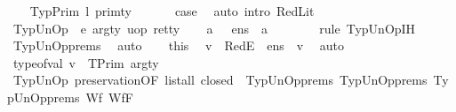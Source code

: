 \begin{isabellebody}
\isamarkupfalse%
\isanewline
\ \ \isamarkupfalse%
\ {\isacharparenleft}{\kern0pt}TypPrim\ l\ prim{\isacharunderscore}{\kern0pt}ty\ {\isasymDelta}{\isacharparenright}{\kern0pt}\isanewline
\ \ \isamarkupfalse%
\ \isamarkupfalse%
\ {\isacharquery}{\kern0pt}case\ \isamarkupfalse%
\ {\isacharparenleft}{\kern0pt}auto\ intro{\isacharcolon}{\kern0pt}\ RedLit{\isacharparenright}{\kern0pt}\isanewline
{}\isamarkupfalse%
\isanewline
\ \ \isamarkupfalse%
\ {\isacharparenleft}{\kern0pt}TypUnOp\ {\isasymDelta}\ e\ arg{\isacharunderscore}{\kern0pt}ty\ uop\ ret{\isacharunderscore}{\kern0pt}ty{\isacharparenright}{\kern0pt}\isanewline
\ \ \isamarkupfalse%
\ {\isachardoublequoteopen}{\isasymexists}a{\isachardot}{\kern0pt}\ {\isasymLambda}{\isacharcomma}{\kern0pt}{\isasymGamma}{\isacharcomma}{\kern0pt}{\isasymOmega}\ {\isasymturnstile}\ {\isasymlangle}e{\isacharcomma}{\kern0pt}n{\isacharunderscore}{\kern0pt}s{\isasymrangle}\ {\isasymDown}\ a{\isachardoublequoteclose}\ \isanewline
\ \ \ \ \ \isamarkupfalse%
\ {\isacharparenleft}{\kern0pt}rule\ TypUnOp{\isachardot}{\kern0pt}IH{\isacharparenright}{\kern0pt}\ \isamarkupfalse%
\ TypUnOp{\isachardot}{\kern0pt}prems\ \isamarkupfalse%
\ auto\isanewline
\ \ \isamarkupfalse%
\ this\ \isamarkupfalse%
\ v{\isacharprime}{\kern0pt}\ \ RedE{\isacharcolon}{\kern0pt}{\isachardoublequoteopen}{\isasymLambda}{\isacharcomma}{\kern0pt}{\isasymGamma}{\isacharcomma}{\kern0pt}{\isasymOmega}\ {\isasymturnstile}\ {\isasymlangle}e{\isacharcomma}{\kern0pt}n{\isacharunderscore}{\kern0pt}s{\isasymrangle}\ {\isasymDown}\ v{\isacharprime}{\kern0pt}{\isachardoublequoteclose}\ \isamarkupfalse%
\ auto\isanewline
\ \ \isamarkupfalse%
\ {\isachardoublequoteopen}type{\isacharunderscore}{\kern0pt}of{\isacharunderscore}{\kern0pt}val\ v{\isacharprime}{\kern0pt}\ {\isacharequal}{\kern0pt}\ TPrim\ arg{\isacharunderscore}{\kern0pt}ty{\isachardoublequoteclose}\ \ \ \ \ \ \ \ \ \isanewline
\ \ \ \ \isamarkupfalse%
\ TypUnOp\ preservation{\isacharparenleft}{\kern0pt}{}{\isacharparenright}{\kern0pt}{\isacharbrackleft}{\kern0pt}OF\ {\isacartoucheopen}list{\isacharunderscore}{\kern0pt}all\ closed\ {\isasymOmega}{\isacartoucheclose}\ TypUnOp{\isachardot}{\kern0pt}prems{\isacharparenleft}{\kern0pt}{}{\isacharparenright}{\kern0pt}\ TypUnOp{\isachardot}{\kern0pt}prems{\isacharparenleft}{\kern0pt}{}{\isacharparenright}{\kern0pt}\ TypUnOp{\isachardot}{\kern0pt}prems{\isacharparenleft}{\kern0pt}{}{\isacharparenright}{\kern0pt}\ Wf{\isacharunderscore}{\kern0pt}{\isasymGamma}\ Wf{\isacharunderscore}{\kern0pt}F{\isacharbrackright}{\kern0pt}\isanewline

\end{isabellebody}
